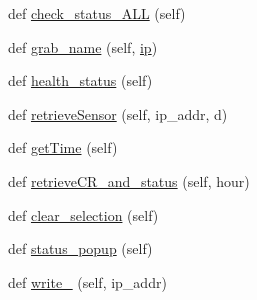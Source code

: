 \begin{DoxyCompactItemize}
\item 
def \hyperlink{classTestingGUI_1_1Health_aa382e2bc40e918613d90dbd819974420}{check\+\_\+status\+\_\+\+A\+LL} (self)
\item 
def \hyperlink{classTestingGUI_1_1Health_a236b797764a726c3fe2d68f2fabaceb8}{grab\+\_\+name} (self, \hyperlink{classTestingGUI_1_1Health_a2c897cb32dd28d657ac3f22c64a14543}{ip})
\item 
def \hyperlink{classTestingGUI_1_1Health_ac36ce2de8d9aa5f3b687da2f836f0b3d}{health\+\_\+status} (self)
\item 
def \hyperlink{classTestingGUI_1_1Health_afde04eeef599765553cce6069cff429e}{retrieve\+Sensor} (self, ip\+\_\+addr, d)
\item 
def \hyperlink{classTestingGUI_1_1Health_ad38efcab164d7bbb4ec16c2086dc7760}{get\+Time} (self)
\item 
def \hyperlink{classTestingGUI_1_1Health_a3a6e2fca0c7a691527b14c79b388f6fd}{retrieve\+C\+R\+\_\+and\+\_\+status} (self, hour)
\item 
def \hyperlink{classTestingGUI_1_1Health_a1e3b9ff5f630c5f6d47bfefe26cfb39b}{clear\+\_\+selection} (self)
\item 
def \hyperlink{classTestingGUI_1_1Health_a06c77fae7dd08337985a3420a2cdbc81}{status\+\_\+popup} (self)
\item 
def \hyperlink{classTestingGUI_1_1Health_a73ccf83145b4adf9452f85a061c23dc9}{write\+\_\+} (self, ip\+\_\+addr)
\end{DoxyCompactItemize}
